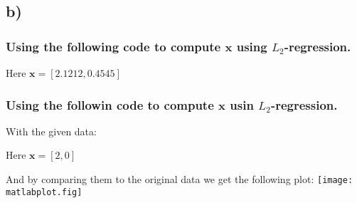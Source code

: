 \documentclass{article}
\renewcommand{\vec}[1]{\mathbf{#1}}
\begin{document}
\subsection*{b)}
\subsubsection*{Using the following code to compute $\vec{x}$ using $L_2$-regression.}

Here $\vec{x} = [2.1212, 0.4545]$

\newpage
\subsubsection*{Using the followin code to compute $\vec{x}$ usin $L_2$-regression.}

With the given data:


Here $\vec{x}= [2, 0]$

And by comparing them to the original data we get the following plot:
\texttt{[image: matlabplot.fig]}
\end{document}
